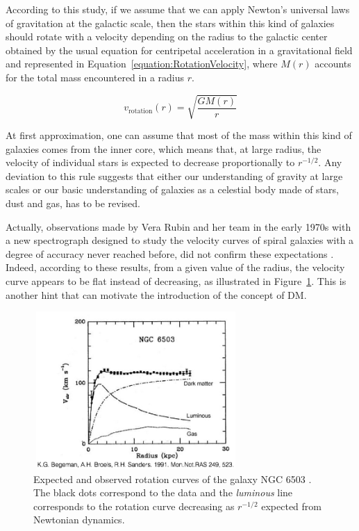 \documentclass[a4paper, 10pt, openright]{report}
\begin{document}
According to this study, if we assume that we can apply Newton's universal laws of gravitation at the galactic scale, then the stars within this kind of galaxies should rotate with a velocity depending on the radius to the galactic center obtained by the usual equation for centripetal acceleration in a gravitational field and represented in Equation~\ref{equation:RotationVelocity}, where $M(r)$ accounts for the total mass encountered in a radius $r$.

\begin{equation} \label{equation:RotationVelocity}
v_{\text{rotation}}(r) = \sqrt{\frac{G M(r)}{r}}
\end{equation}

At first approximation, one can assume that most of the mass within this kind of galaxies comes from the inner core, which means that, at large radius, the velocity of individual stars is expected to decrease proportionally to $r^{-1/2}$. Any deviation to this rule suggests that either our understanding of gravity at large scales or our basic understanding of galaxies as a celestial body made of stars, dust and gas, has to be revised.

Actually, observations made by Vera Rubin and her team in the early 1970s with a new spectrograph designed to study the velocity curves of spiral galaxies with a degree of accuracy never reached before, did not confirm these expectations \cite{VeraRubin}. Indeed, according to these results, from a given value of the radius, the velocity curve appears to be flat instead of decreasing, as illustrated in Figure~\ref{figure:RotationCurves}. This is another hint that can motivate the introduction of the concept of \ac{DM}.

\begin{figure}[htbp]
\begin{center}
\includegraphics[width=7.8cm, height=6cm]{figs/RotationCurve.jpeg}
\caption{Expected and observed rotation curves of the galaxy NGC 6503 \cite{RotationCurves}. The black dots correspond to the data and the \textit{luminous} line corresponds to the rotation curve decreasing as $r^{-1/2}$ expected from Newtonian dynamics.}
\label{figure:RotationCurves}
\end{center}
\end{figure}
\end{document}
